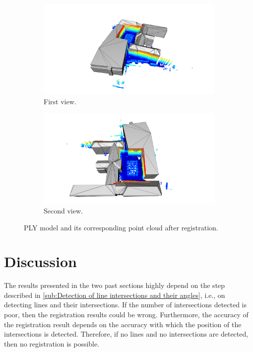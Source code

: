         \begin{figure}[H]
            \centering
            \begin{subfigure}{1\textwidth}
                \centering
                \includegraphics[scale=0.15]{images/solution_images/final_ply_a.png}
                \caption{First view.}
                \label{fig:final_ply_a}
            \end{subfigure}
            \hfill
            \begin{subfigure}{1\textwidth}
                \centering
                \includegraphics[scale=0.15]{images/solution_images/final_ply_b.png}
                \caption{Second view.}
                \label{fig:final_ply_b}
            \end{subfigure}
            \caption{PLY model and its corresponding point cloud after registration.}
            \label{fig:final_ply}
        \end{figure}

    \section{Discussion}
        The results presented in the two past sections highly depend on the step described in 
        \autoref{sub:Detection of line intersections and their angles}, i.e., on detecting lines and their intersections.
        If the number of intersections detected is poor, then the registration results could be wrong.
        Furthermore, the accuracy of the registration result depends on the accuracy with which the position of the intersections is detected.
        Therefore, if no lines and no intersections are detected, then no registration is possible.

